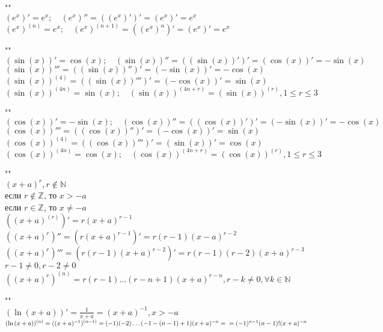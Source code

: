 



\begin{properties} ""\\
	$(e^{x})'=e^{x}; \quad (e^{x})''=((e^{x})')'=(e^{x})'=e^{x}$ \\
		$(e^{x})^{(n)}=e^{x}; \quad (e^{x})^{(n+1)}=((e^{x})^{n})'=(e^{x})'=e^{x}$ 
\end{properties}
\begin{properties} ""\\
	$(\sin (x))'=\cos (x); \quad (\sin (x))''=((\sin (x))')'=(\cos (x))'=-\sin (x)$\\
		$(\sin (x))'''=((\sin (x))'')'=(-\sin (x))'=-\cos (x)$ \\
		$(\sin (x))^{(4)}=((\sin (x))''')'=(-\cos (x))'=\sin (x)$ \\
		$(\sin (x))^{(4n)}=\sin (x); \quad (\sin (x))^{(4n+r)}=(\sin (x))^{(r)}, 1\le r \le 3$ 
\end{properties}
\begin{properties} ""\\
	$(\cos (x))'=-\sin (x); \quad (\cos (x))''=((\cos (x))')'=(-\sin (x))'=-\cos (x)$ \\
		$(\cos (x))'''=((\cos (x))'')'=(-\cos (x))'=\sin (x)$ \\
		$(\cos (x))^{(4)}=((\cos (x))''')'=(\sin (x))'=\cos (x)$ \\
		$(\cos (x))^{(4n)}=\cos (x); \quad (\cos (x))^{(4n+r)}=(\cos (x))^{(r)}, 1\le r\le 3$
\end{properties}
\begin{properties} ""\\
	$(x+a)^{r}, r \not\in \mathbb{N}$ \\
		если $r \not\in \mathbb{Z}$, то $x > -a$\\
		если  $r \in \mathbb{Z}$, то $x \neq -a$\\
		$((x+a)^{(r)})'=r(x+a)^{r-1}$ \\
		$((x+a)^{r})''=(r(x+a)^{r-1})'=r(r-1)(x-a)^{r-2}$ \\
		$((x+a)^{r})'''=(r(r-1)(x+a)^{r-2})'=r(r-1)(r-2)(x+a)^{r-3}$\\
		$r-1\neq 0, r-2 \neq 0$\\
		$((x+a)^{r})^{(n)}=r(r-1)\ldots(r-n+1)(x+a)^{r-n}, r-k\neq 0, \forall k \in \mathbb{N}$ 
\end{properties}
\begin{properties} ""\\
	$(\ln {(x+a)})'=\displaystyle\frac{1}{x+a}=(x+a)^{-1}, x>-a$\\
	$(\ln {(x+a)})^{(n)}=((x+a)^{-1})^{(n-1)}=(-1)(-2)\ldots(-1-(n-1)+1)(x+a)^{-n}=\\=(-1)^{n-1}(n-1)!(x+a)^{-n}$ 
\end{properties}
